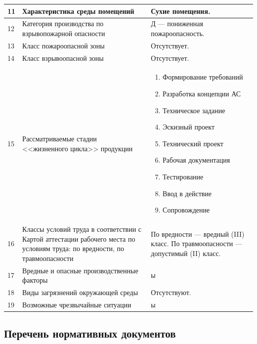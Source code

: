 \begin{footnotesize}
\begin{longtable}[h]{|p{}|p{}|p{}|}
	\hline
		11 & 
		Характеристика среды помещений &
		Сухие помещения. \\
	\hline
		12 & 
		Категория производства по взрывопожарной опасности &
		Д --- пониженная пожароопасность. \\
	\hline
		13 & 
		Класс пожароопасной зоны &
		Отсутствует. \\
	\hline
		14 & 
		Класс взрывоопасной зоны &
		Отсутствует. \\
	\hline
		15 & 
		Рассматриваемые стадии <<жизненного цикла>> продукции &
		\begin{enumerate}
			\item Формирование требований
			\item Разработка концепции АС 
			\item Техническое задание 
			\item Эскизный проект
			\item Технический проект
			\item Рабочая документация
			\item Тестирование
			\item Ввод в действие
			\item Сопровождение
		\end{enumerate} \\
	\hline
		16 & 
		Классы условий труда в соответствии с Картой аттестации рабочего места по условиям труда: \newline
		по вредности, \newline
		по травмоопасности &
		По вредности --- вредный (III) класс. \newline
		По травмоопасности --- допустимый (II) класс. \\
	\hline
		17 & 
		Вредные и опасные производственные факторы &
		ы \\
	\hline
		18 & 
		Виды загрязнений окружающей среды &
		Отсутствуют. \\
	\hline
		19 & 
		Возможные чрезвычайные ситуации &
		ы \\
	\hline
\end{longtable}
\end{footnotesize}

\subsection{Перечень нормативных документов}

